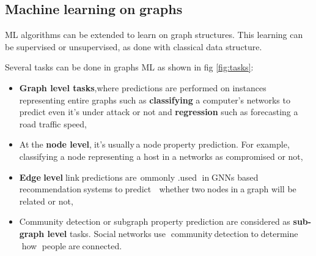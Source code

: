 \subsection{Machine\textcolor{white}{.}learning\textcolor{white}{.}on\textcolor{white}{.}graphs}
ML algorithms can be extended to learn on graph structures. This learning can be supervised or unsupervised, as done with classical data structure.


Several tasks can be done in graphs ML as shown in fig \ref{fig:tasks}:
\begin{itemize}
    \item \textbf{Graph level tasks},where predictions are performed on instances representing entire graphs such as \textbf{classifying} a computer's networks to predict even it's under attack or not and \textbf{regression} such as forecasting a road traffic speed,
    \item At\textcolor{white}{.}the\textbf{\textcolor{white}{.}node level},\textcolor{white}{.}it's\textcolor{white}{.}usually\textcolor{white}{.}a node\textcolor{white}{.}property prediction. For example, classifying a node representing a host in a networks as compromised or not,
    \item \textbf{Edge\textcolor{white}{.}level}\textcolor{white}{.}link\textcolor{white}{.}predictions\textcolor{white}{.}are\textcolor{white}commonly {.}used\textcolor{white}{.} in\textcolor{white}{.}GNNs based recommendation\textcolor{white}{.}systems\textcolor{white}{.}to\textcolor{white}{.}predict \textcolor{white}{.} whether\textcolor{white}{.}two\textcolor{white}{.}nodes\textcolor{white}{.}in\textcolor{white}{.}a\textcolor{white}{.}graph will be related or not,
    \item Community detection or subgraph property prediction are considered as \textbf{sub-graph level} tasks. Social\textcolor{white}{.}networks\textcolor{white}{.}use\textcolor{white}{.} community\textcolor{white}{.}detection\textcolor{white}{.}to\textcolor{white}{.}determine \textcolor{white}{.}how \textcolor{white}{.}people\textcolor{white}{.}are\textcolor{white}{.}connected. 
\end{itemize}



